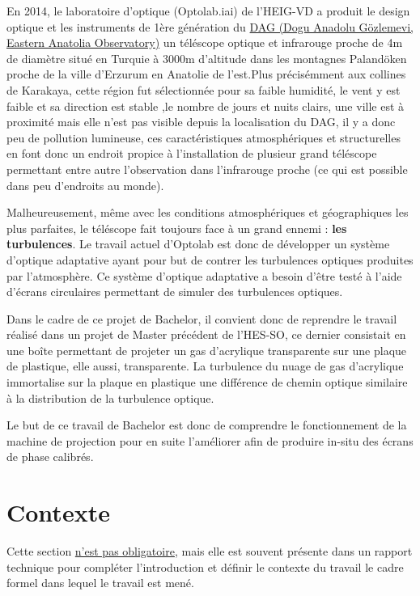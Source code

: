 
En 2014, le laboratoire d'optique (Optolab.iai) de l'HEIG-VD a produit le design optique et les instruments de 1ère génération du \href{https://atasam.atauni.edu.tr/}{DAG (Dogu Anadolu Gözlemevi, Eastern Anatolia Observatory)}\footnotemark
un téléscope optique et infrarouge proche de 4m de diamètre situé en Turquie à 3000m d'altitude dans les montagnes Palandöken proche de la ville d'Erzurum en Anatolie de l'est.Plus précisémment aux collines de Karakaya, cette région fut sélectionnée pour sa faible humidité, le vent y est faible et sa direction est stable
,le nombre de jours et nuits clairs, une ville est à proximité mais elle n'est pas visible depuis la localisation du DAG, il y a donc peu de pollution lumineuse, ces caractéristiques atmosphériques et structurelles en font donc un endroit propice à l'installation de plusieur grand téléscope permettant entre autre l'observation
dans l'infrarouge proche (ce qui est possible dans peu d'endroits au monde).

Malheureusement, même avec les conditions atmosphériques et géographiques les plus parfaites, le téléscope fait toujours face à un grand ennemi : \textbf{les turbulences}.
Le travail actuel d'Optolab est donc de développer un système d'optique adaptative ayant pour but de contrer les turbulences optiques produites par l'atmosphère. Ce système
d'optique adaptative a besoin d'être testé à l'aide d'écrans circulaires permettant de simuler des turbulences optiques.

Dans le cadre de ce projet de Bachelor, il convient donc de reprendre le travail réalisé dans un projet de Master précédent de l'HES-SO, ce dernier consistait en une boîte permettant de projeter un gas d'acrylique transparente sur une plaque de plastique, elle aussi, transparente. La turbulence du nuage de gas
d'acrylique immortalise sur la plaque en plastique une différence de chemin optique similaire à la distribution de la turbulence optique.

Le but de ce travail de Bachelor est donc de comprendre le fonctionnement de la machine de projection pour en suite l'améliorer afin de produire in-situ des écrans de phase calibrés.

\newpage


\section{Contexte}
Cette section \underline{n'est pas obligatoire}, mais elle est souvent présente dans un rapport technique pour compléter l'introduction et définir le contexte du travail \cad le cadre formel dans lequel le travail est mené.



